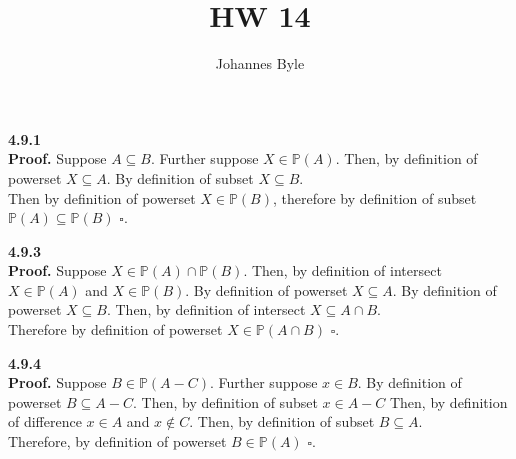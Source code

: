\documentclass[12pt]{article}
\title{HW 14}
\author{Johannes Byle}
\newcommand{\pset}[1]{$$\mathbb{P}(#1)}
\begin{document}
    \maketitle
    \noindent
    \textbf{4.9.1}\\
    \textbf{Proof.} Suppose $A\subseteq B$.
    Further suppose $X\in\mathbb{P}(A)$.
    Then, by definition of powerset $X\subseteq A$.
    By definition of subset $X\subseteq B$.\\
    Then by definition of powerset $X\in\mathbb{P}(B)$, therefore by definition of subset $\mathbb{P}(A)\subseteq\mathbb{P}(B)$ $\square$.\\


    \maketitle
    \noindent
    \textbf{4.9.3}\\
    \textbf{Proof.} Suppose $X\in\mathbb{P}(A)\cap\mathbb{P}(B)$.
    Then, by definition of intersect $X\in\mathbb{P}(A)$ and $X\in\pset{B}$.
    By definition of powerset $X\subseteq A$.
    By definition of powerset $X\subseteq B$.
    Then, by definition of intersect $X\subseteq A\cap B$.\\
    Therefore by definition of powerset $X\in\pset{A\cap B}$ $\square$.\\

    \maketitle
    \noindent
    \textbf{4.9.4}\\
    \textbf{Proof.} Suppose $B\in\pset{A-C}$.
    Further suppose $x\in B$.
    By definition of powerset $B\subseteq A-C$.
    Then, by definition of subset $x\in A-C$
    Then, by definition of difference $x\in A$ and $x\notin C$.
    Then, by definition of subset $B\subseteq A$.\\
    Therefore, by definition of powerset $B\in\pset{A}$ $\square$.\\
\end{document}

